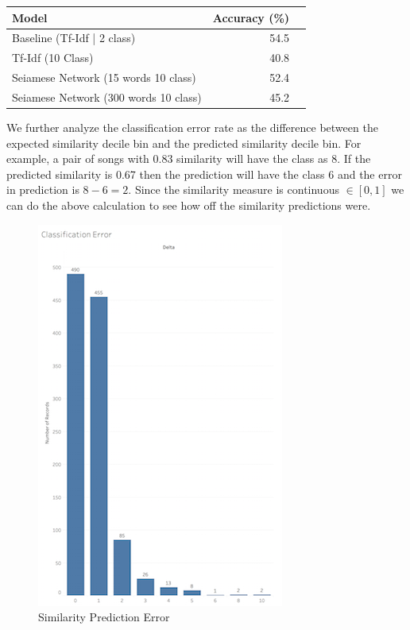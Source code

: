 \documentclass[11pt]{article}
\begin{document}
\begin{table}[h]
\begin{center}
\begin{tabular}{|l|rl|}
\hline \bf Model & \bf Accuracy (\%) \\ \hline
Baseline 
(Tf-Idf | 2 class) & 54.5 \\
Tf-Idf (10 Class) & 40.8 \\
Seiamese Network 
(15 words 10 class) & 52.4 \\
Seiamese Network 
(300 words 10 class) & 45.2 \\
\hline
\end{tabular}
\end{center}
\end{table}

We further analyze the classification error rate as the difference between
the expected similarity decile bin and the predicted similarity decile bin.
For example, a pair of songs with 0.83 similarity will have the class as 8.
If the predicted similarity is 0.67 then the prediction will have the class 
6 and the error in prediction is $8-6=2$. Since the similarity  measure is
continuous $\in [0,1]$ we can do the above calculation to see how off the 
similarity predictions were.
\begin{figure}
  \includegraphics[width=\linewidth]{error.png}
  \caption{Similarity Prediction Error}
  \label{fig:error}
\end{figure}
\end{document}
